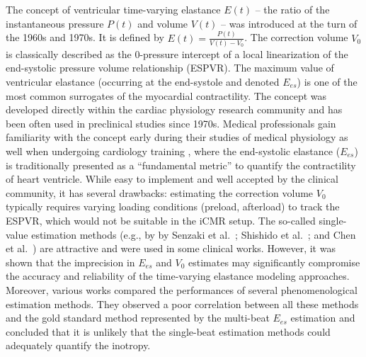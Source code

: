 The concept of ventricular time-varying elastance $E(
t)$ -- the ratio of the instantaneous pressure $P(t)$ and volume $V(t)$ -- was  introduced at the turn of the 1960s and 1970s\cite{suga_time_1969,suga_TheoreticalTVEconcept_1971}.  It is defined by 
$E(t)=\frac{P(t)}{V(t)-V_0}$. 
The correction volume $V_0$ is classically described as the 0-pressure intercept of a local linearization of the end-systolic pressure volume relationship (ESPVR).
The maximum value of ventricular elastance (occurring at the end-systole and denoted $E_{es}$) is one of the most common surrogates of the myocardial contractility.  
The concept was developed directly within the cardiac physiology research community and has been often used in preclinical studies since 1970s. 
Medical professionals gain familiarity with the concept early during their studies of medical physiology  \cite{Ganong_physiologyTextbook,Guyton_textbook}  as well when undergoing  cardiology training  \cite{Braunwald_CardiologyTextbook}, where the end-systolic elastance ($E_{es}$) is traditionally presented as a ``fundamental metric''  to quantify the contractility of heart ventricle.  
While easy to implement and well accepted by the clinical community\cite{hiremath2023_PVloop_review}, it has several drawbacks: estimating the correction volume $V_0$ typically requires varying loading conditions (preload, afterload) to track the ESPVR, which would not be suitable in the iCMR setup. The so-called single-value estimation methods (e.g., by by Senzaki et al.~\cite{senzaki_single-beat_1996}; Shishido et al.~\cite{shishido_single-beat_2000}; and Chen et al.~\cite{chen_noninvasive_2001}) are attractive and were used in some clinical works.  However, it was shown that the imprecision in $E_{es}$ and $V_0$ estimates\cite{legall19}  may significantly compromise the accuracy and reliability of the time-varying elastance modeling approaches. Moreover, various works\cite{wo_assessment_2019,kjorstad_pressure-volume-based_2002} compared the performances of several phenomenological estimation methods. %
They observed  a poor correlation between all these methods and the gold standard method represented by the multi-beat $E_{es}$ estimation and concluded that it is unlikely that the single-beat estimation methods could adequately quantify the inotropy.
 
